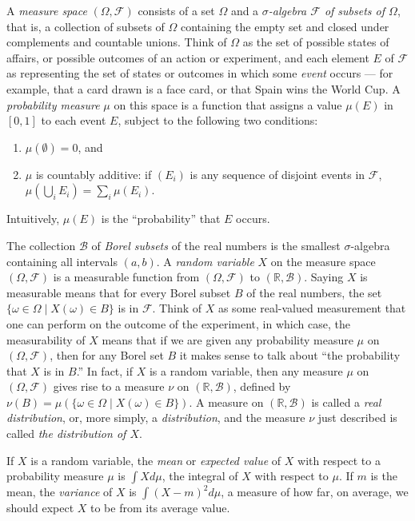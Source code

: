 \documentclass{svjour3}
\newcommand{\RR}{\mathbb{R}}
\newcommand{\mdl}[1]{{\mathcal #1}} %
\newcommand{\st}{ \; | \;} %
\begin{document}
A \emph{measure space} $(\Omega, \mdl F)$ consists of a set $\Omega$ and a \emph{$\sigma$-algebra $\mdl F$ of subsets of $\Omega$}, that is, a collection of subsets of $\Omega$ containing the empty set and closed under complements and countable unions. Think of $\Omega$ as the set of possible states of affairs, or possible outcomes of an action or experiment, and each element $E$ of $\mdl F$ as representing the set of states or outcomes in which some \emph{event} occurs --- for example, that a card drawn is a face card, or that Spain wins the World Cup. A \emph{probability measure} $\mu$ on this space is a function that assigns a value $\mu(E)$ in $[0, 1]$ to each event $E$, subject to the following two conditions:
\begin{enumerate}
 \item $\mu(\emptyset) = 0$, and
 \item $\mu$ is countably additive: if $(E_i)$ is any sequence of disjoint events in $\mdl F$, $\mu(\bigcup_i E_i) = \sum_i \mu(E_i)$.
\end{enumerate}
Intuitively, $\mu(E)$ is the ``probability'' that $E$ occurs. 

The collection $\mdl B$ of \emph{Borel subsets} of the real numbers is the smallest $\sigma$-algebra containing all intervals $(a, b)$. A \emph{random variable} $X$ on the measure space $(\Omega, \mdl F)$ is a measurable function from $(\Omega, \mdl F)$ to $(\RR, \mdl B)$. Saying $X$ is measurable means that for every Borel subset $B$ of the real numbers, the set $\{ \omega \in \Omega \st X(\omega) \in B \}$ is in $\mdl F$. Think of $X$ as some real-valued measurement that one can perform on the outcome of the experiment, in which case, the measurability of $X$ means that if we are given any probability measure $\mu$ on $(\Omega, \mdl F)$, then for any Borel set $B$ it makes sense to talk about ``the probability that $X$ is in $B$.'' In fact, if $X$ is a random variable, then any measure $\mu$ on $(\Omega, \mdl F)$ gives rise to a measure $\nu$ on $(\RR, \mdl B)$, defined by $\nu(B) = \mu ( \{ \omega \in \Omega \st X (\omega) \in B \})$. A measure on $(\RR, \mdl B)$ is called a \emph{real distribution}, or, more simply, a \emph{distribution}, and the measure $\nu$ just described is called \emph{the distribution of $X$}.

If $X$ is a random variable, the \emph{mean} or \emph{expected value} of $X$ with respect to a probability measure $\mu$ is $\int X d\mu$, the integral of $X$ with respect to $\mu$. If $m$ is the mean, the \emph{variance} of $X$ is $\int (X - m)^2 d\mu$, a measure of how far, on average, we should expect $X$ to be from its average value.
\end{document}

